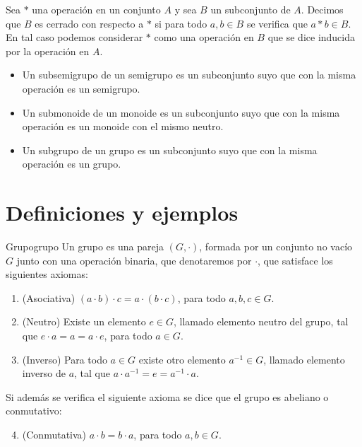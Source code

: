 Sea $*$ una operación en un conjunto $A$ y sea $B$ un subconjunto de $A$. Decimos que $B$ es cerrado con respecto a $*$ si para todo $a, b \in B$ se verifica que $a * b \in B$. En tal caso podemos
considerar $*$ como una operación en $B$ que se dice inducida por la operación en $A$.

\begin{itemize}
\item Un subsemigrupo de un semigrupo es un subconjunto suyo que con la misma operación es un semigrupo.

\item Un submonoide de un monoide es un subconjunto suyo que con la misma operación es un monoide con el mismo neutro.

\item Un subgrupo de un grupo es un subconjunto suyo que con la misma operación es un grupo.
\end{itemize}

\clearpage
\section{Definiciones y ejemplos}

\begin{definition}{Grupo}{grupo}
    Un grupo es una pareja \((G,\cdot)\), formada por un conjunto no vacío \(G\) junto con una operación binaria, que denotaremos por \(\cdot\), que satisface los siguientes axiomas:
    \begin{enumerate}
    \item {(Asociativa)} \((a\cdot b)\cdot c = a\cdot(b\cdot c)\), para todo \(a,b,c\in G\).
    \item {(Neutro)} Existe un elemento \(e\in G\), llamado {elemento neutro del grupo}, tal que \(e\cdot a = a = a\cdot e\), para todo \(a\in G\).
    \item {(Inverso)} Para todo \(a\in G\) existe otro elemento \(a^{-1}\in G\), llamado {elemento inverso} de \(a\), tal que \(a\cdot a^{-1} = e = a^{-1}\cdot a\).
    \end{enumerate}

    Si además se verifica el siguiente axioma se dice que el grupo es {abeliano} o {conmutativo}:

    \begin{enumerate}
    \setcounter{enumi}{3}
    \item {(Conmutativa)} \(a\cdot b = b\cdot a\), para todo \(a,b\in G\).
    \end{enumerate}
\end{definition}

